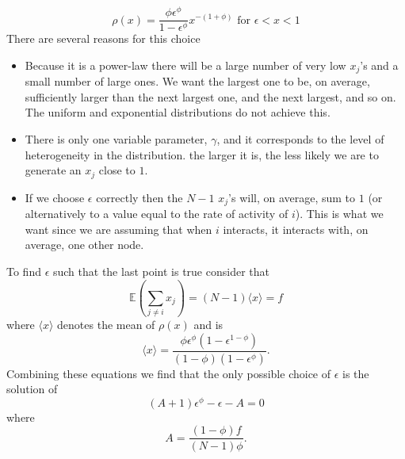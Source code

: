 \documentclass[10pt]{article}
\begin{document}
\begin{multicols}{2}
\begin{equation}
\rho(x)=\frac{\phi\epsilon^{\phi}}{1-\epsilon^{\phi}}x^{-(1+\phi)} \text{ for } \epsilon<x<1
\end{equation}
There are several reasons for this choice
\begin{itemize}
\item Because it is a power-law there will be a large number of very low $x_{j}$'s and a small number of large ones. We want the largest one to be, on average, sufficiently larger than the next largest one, and the next largest, and so on. The uniform and exponential distributions do not achieve this.
 
\item There is only one variable parameter, $\gamma$, and it corresponds to the level of heterogeneity in the distribution. the larger it is, the less likely we are to generate an $x_{j}$ close to $1$.

\item If we choose $\epsilon$ correctly then the $N-1$ $x_{j}$'s will, on average, sum to $1$ (or alternatively to a value equal to the rate of activity of $i$). This is what we want since we are assuming that when $i$ interacts, it interacts with, on average, one other node. 
\end{itemize}

To find $\epsilon$ such that the last point is true consider that
\begin{equation}
\label{sum_of_x}
\mathbb{E}\left(\sum_{j \neq i}x_{j}\right) = (N-1) \langle x \rangle = f
\end{equation}
where $\langle x \rangle$ denotes the mean of $\rho(x)$ and is 
\begin{equation}
\label{x_mean}
\langle x \rangle=\frac{\phi\epsilon^{\phi}(1-\epsilon^{1-\phi})}{(1-\phi)(1-\epsilon^{\phi})}.
\end{equation}
Combining these equations we find that the only possible choice of $\epsilon$ is the solution of
\begin{equation}
\label{A_poly}
(A+1)\epsilon^{\phi}-\epsilon-A=0
\end{equation}
where
\begin{equation}
\label{A_def}
A=\frac{(1-\phi)f}{(N-1)\phi}.
\end{equation}


\end{multicols}
\end{document}
